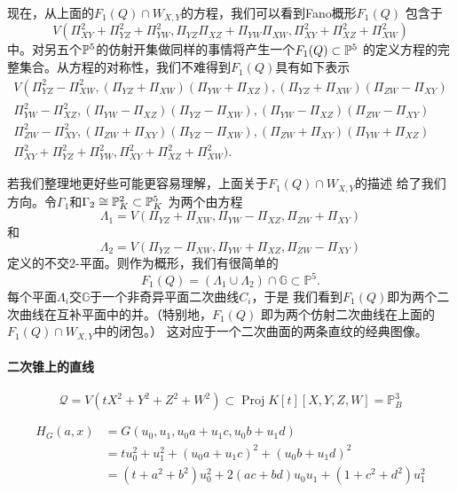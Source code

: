 现在，从上面的$F_1(Q)\cap W_{X,Y}$的方程，我们可以看到Fano概形$F_1(Q)$
包含于
\[
	V(\Pi_{XY}^2+\Pi_{YZ}^2+\Pi_{YW}^2,\Pi_{YZ}\Pi_{XZ}+\Pi_{YW}\Pi_{XW},\Pi_{XY}^2+\Pi_{XZ}^2+\Pi_{XW}^2)
\]
中。对另五个$\P^5$的仿射开集做同样的事情将产生一个$F_1(Q)\subset \P^5$
的定义方程的完整集合。从方程的对称性，我们不难得到$F_1(Q)$具有如下表示
\[
\begin{array}{l}{V\left(\Pi_{Y Z}^{2}-\Pi_{X W}^{2},\left(\Pi_{Y Z}+\Pi_{X W}\right)\left(\Pi_{Y W}+\Pi_{X Z}\right),\left(\Pi_{Y Z}+\Pi_{X W}\right)\left(\Pi_{Z W}-\Pi_{X Y}\right)\right.} \\ {\Pi_{Y W}^{2}-\Pi_{X Z}^{2},\left(\Pi_{Y W}-\Pi_{X Z}\right)\left(\Pi_{Y Z}-\Pi_{X W}\right),\left(\Pi_{Y W}-\Pi_{X Z}\right)\left(\Pi_{Z W}-\Pi_{X Y}\right)} \\ {\Pi_{Z W}^{2}-\Pi_{X Y}^{2},\left(\Pi_{Z W}+\Pi_{X Y}\right)\left(\Pi_{Y Z}-\Pi_{X W}\right),\left(\Pi_{Z W}+\Pi_{X Y}\right)\left(\Pi_{Y W}+\Pi_{X Z}\right)} \\ {\Pi_{X Y}^{2}+\Pi_{Y Z}^{2}+\Pi_{Y W}^{2}, \Pi_{X Y}^{2}+\Pi_{X Z}^{2}+\Pi_{X W}^{2} )}.\end{array}
\]

若我们整理地更好些可能更容易理解，上面关于$F_1(Q)\cap W_{X,Y}$的描述
给了我们方向。令$\Gamma_1$和$\Gamma_2\cong \P_K^2\subset \P_K^5$
为两个由方程
\[
	\Lambda_{1}=V\left(\Pi_{Y Z}+\Pi_{X W}, \Pi_{Y W}-\Pi_{X Z}, \Pi_{Z W}+\Pi_{X Y}\right)
\]
和
\[
	\Lambda_{2}=V\left(\Pi_{Y Z}-\Pi_{X W}, \Pi_{Y W}+\Pi_{X Z}, \Pi_{Z W}-\Pi_{X Y}\right)
\]
定义的不交$2$-平面。则作为概形，我们有很简单的
\[
	F_{1}(Q)=\left(\Lambda_{1} \cup \Lambda_{2}\right) \cap \mathbb{G} \subset \mathbb{P}^{5}.
\]%
%
%
每个平面$\Lambda_i$交$\mathbb G$于一个非奇异平面二次曲线$C_i$，于是
我们看到$F_1(Q)$即为两个二次曲线在互补平面中的并。（特别地，$F_1(Q)$
即为两个仿射二次曲线在上面的$F_1(Q)\cap W_{X,Y}$中的闭包。）
这对应于一个二次曲面的两条直纹的经典图像。\nottran


\paragraph*{二次锥上的直线}

\nottran

\[
	\mathscr{Q}=V\left(t X^{2}+Y^{2}+Z^{2}+W^{2}\right) \subset \operatorname{Proj} K[t][X, Y, Z, W]=\mathbb{P}_{B}^{3}
\]

\[
\begin{aligned} H_{G}(a, x) &=G\left(u_{0}, u_{1}, u_{0} a+u_{1} c, u_{0} b+u_{1} d\right) \\ &=t u_{0}^{2}+u_{1}^{2}+\left(u_{0} a+u_{1} c\right)^{2}+\left(u_{0} b+u_{1} d\right)^{2} \\ &=\left(t+a^{2}+b^{2}\right) u_{0}^{2}+2(a c+b d) u_{0} u_{1}+\left(1+c^{2}+d^{2}\right) u_{1}^{2} \end{aligned}
\]

